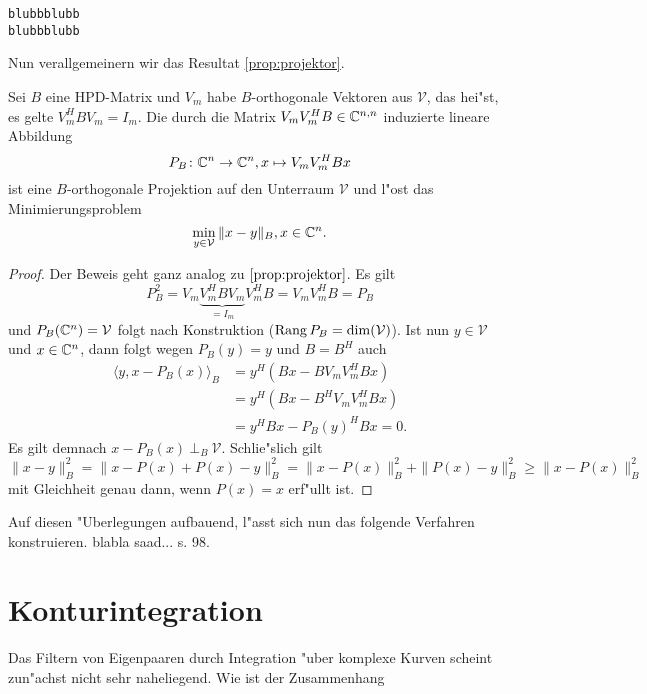 \begin{lstlisting}[caption = Verallgemeinertes Rayleigh-Ritz-Verfahren (Vgl. ~\cite{ptep} Algorithmus A\text{,} S. 356 \textcolor{red}{wie richtig angeben?}), captionpos=b]
blubbblubb
blubbblubb
\end{lstlisting}

Nun verallgemeinern wir das Resultat \ref{prop:projektor}.

\begin{prop}
Sei $B$ eine HPD-Matrix und $V_m$ habe $B$-orthogonale Vektoren aus $\mathcal{V}$,
das hei"st, es gelte $V_m^H B V_m = I_m$.
Die durch die Matrix $V_m V_m^H B \in \mathbb{C}^{n,n}$ induzierte lineare Abbildung
\[
P_B \colon \mathbb{C}^n \to \mathbb{C}^n, x\mapsto V_m V_m^H Bx
\]
ist eine $B$-orthogonale Projektion auf den Unterraum $\mathcal{V}$ und l"ost das Minimierungsproblem
\[
\min_{y\in\mathcal{V}} \|x - y\|_B, x\in\mathbb{C}^n.
\]
\end{prop}

\begin{proof}
Der Beweis geht ganz analog zu $\ref{prop:projektor}$. Es gilt
\[
P_B^2 = V_m \underbrace{V_m^H B V_m}_{=I_m} V_m^H B = V_m V_m^H B = P_B
\]
und $P_B(\mathbb{C}^n) = \mathcal{V}$ folgt nach Konstruktion ($\operatorname{Rang}{P_B} = \dim(\mathcal{V})$). Ist nun $y\in\mathcal{V}$
und $x\in\mathbb{C}^n$, dann folgt wegen $P_B (y) = y$ und $B=B^H$ auch
\begin{align*}
\langle y, x-P_B(x)\rangle_B &= y^H (Bx - B V_m V_m^H Bx) \\
&= y^H (Bx - B^H V_m V_m^H Bx) \\
&= y^H Bx - P_B(y)^H Bx = 0.
\end{align*}
Es gilt demnach $x-P_B(x) \ \bot_B \ \mathcal{V}$. Schlie"slich gilt
\[
\|x-y\|_B^2 = \|x-P(x) + P(x)-y\|_B^2 = \|x-P(x)\|_B^2 + \|P(x)-y\|_B^2
\ge \|x-P(x)\|_B^2
\]
mit Gleichheit genau dann, wenn $P(x)=x$ erf"ullt ist.
\end{proof}


Auf diesen "Uberlegungen aufbauend, l"asst sich nun das folgende Verfahren konstruieren.
blabla saad... s. 98.


\section{Konturintegration}
Das Filtern von Eigenpaaren durch Integration "uber komplexe Kurven scheint
zun"achst nicht sehr naheliegend. Wie ist der Zusammenhang

